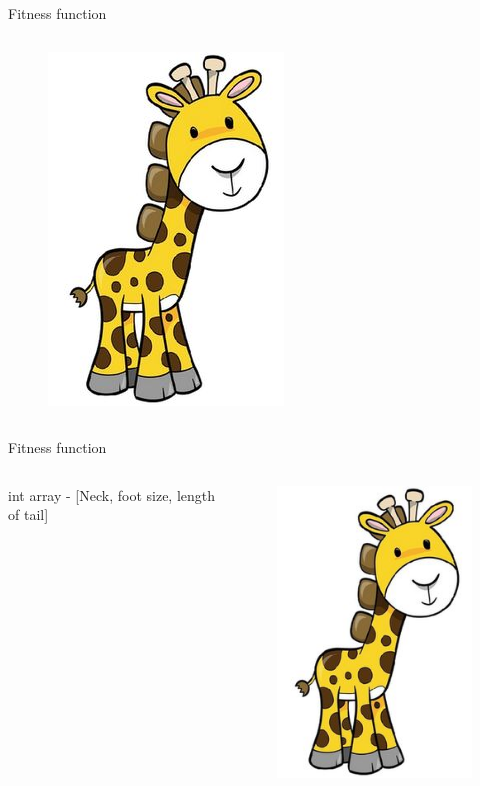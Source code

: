 \documentclass[24pt]{beamer}
\begin{document}
    \begin{frame}{Fitness function}
        \begin{columns}
                \begin{figure}
                \includegraphics[scale=0.5]{giraffe}
                \end{figure}
        \end{columns}
    \end{frame}

    \begin{frame}{Fitness function}
        \begin{columns}
                int array - [Neck, foot size, length of tail]
                \begin{figure}
                \includegraphics[scale=0.5]{giraffe}
                \end{figure}
        \end{columns}
    \end{frame}
\end{document}
